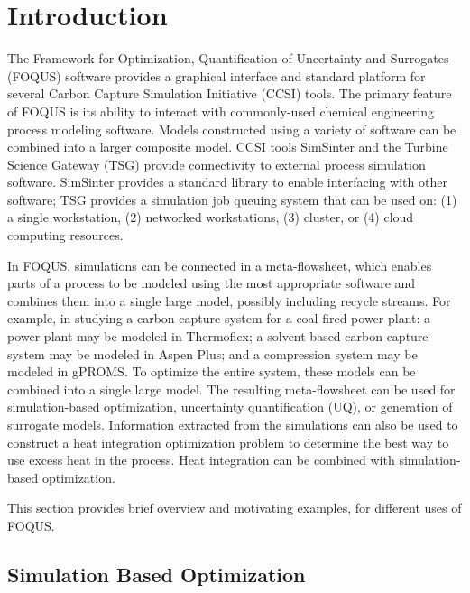 \chapter{Introduction}

The Framework for Optimization, Quantification of Uncertainty and Surrogates (FOQUS) software provides a graphical interface and standard platform for several Carbon Capture Simulation Initiative (CCSI) tools. The primary feature of FOQUS is its ability to interact with commonly-used chemical engineering process modeling software. Models constructed using a variety of software can be combined into a larger composite model. CCSI tools SimSinter and the Turbine Science Gateway (TSG) provide connectivity to external process simulation software. SimSinter provides a standard library to enable interfacing with other software; TSG provides a simulation job queuing system that can be used on: (1) a single workstation, (2) networked workstations, (3) cluster, or (4) cloud computing resources.

In FOQUS, simulations can be connected in a meta-flowsheet, which enables parts of a process to be modeled using the most appropriate software and combines them into a single large model, possibly including recycle streams. For example, in studying a carbon capture system for a coal-fired power plant: a power plant may be modeled in Thermoflex; a solvent-based carbon capture system may be modeled in Aspen Plus; and a compression system may be modeled in gPROMS. To optimize the entire system, these models can be combined into a single large model. The resulting meta-flowsheet can be used for simulation-based optimization, uncertainty quantification (UQ), or generation of surrogate models. Information extracted from the simulations can also be used to construct a heat integration optimization problem to determine the best way to use excess heat in the process. Heat integration can be combined with simulation-based optimization.

This section provides brief overview and motivating examples, for different uses of FOQUS.  

\section{Simulation Based Optimization}

